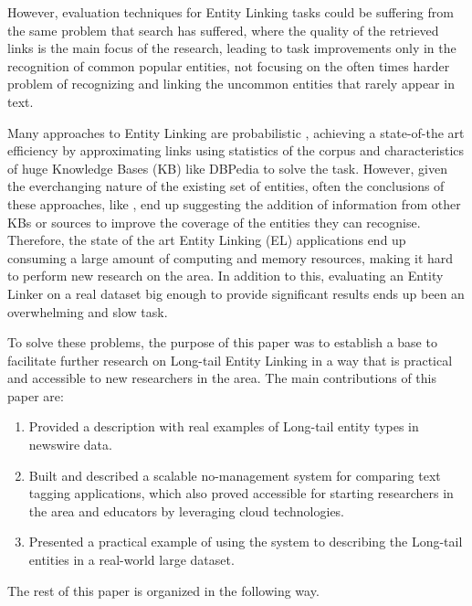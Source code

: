 However, evaluation techniques for Entity Linking tasks could be suffering from the same problem that search has suffered\cite{webpatterns}, where the quality
of the retrieved links is the main focus of the research, leading to task improvements only in the recognition of common popular entities, not focusing on the
often times harder problem of recognizing and linking the uncommon entities that rarely appear in text.

Many approaches to Entity Linking are probabilistic \cite{probabilistic} \cite{rw_elo_morsey2012dbpedia} \cite{rw_elo_Nadeau2009},
achieving a state-of-the art efficiency by approximating links using statistics of the corpus and characteristics of huge Knowledge Bases (KB) like DBPedia
\cite{rw_elo_morsey2012dbpedia} to solve the task.
However, given the everchanging nature of the existing set of entities, often the conclusions of these approaches, like \cite{probabilistic}, end up suggesting
the addition of information from other KBs or sources to improve the coverage of the entities they can recognise.
Therefore, the state of the art Entity Linking (EL) applications end up consuming a large amount of computing and memory resources, making it hard to perform new research on the area.
In addition to this, evaluating an Entity Linker on a real dataset big enough to provide significant results ends up been an overwhelming and slow task.

To solve these problems, the purpose of this paper was to establish a base to facilitate further research on Long-tail Entity Linking
in a way that is practical and accessible to new researchers in the area.
The main contributions of this paper are:
\begin{enumerate}
  \item Provided a description with real examples of Long-tail entity types in newswire data.
  \item Built and described a scalable no-management system for comparing text tagging applications, which also proved accessible for starting researchers in the area and educators by leveraging cloud technologies.
  \item Presented a practical example of using the system to describing the Long-tail entities in a real-world large dataset.
\end{enumerate}

The rest of this paper is organized in the following way. 
